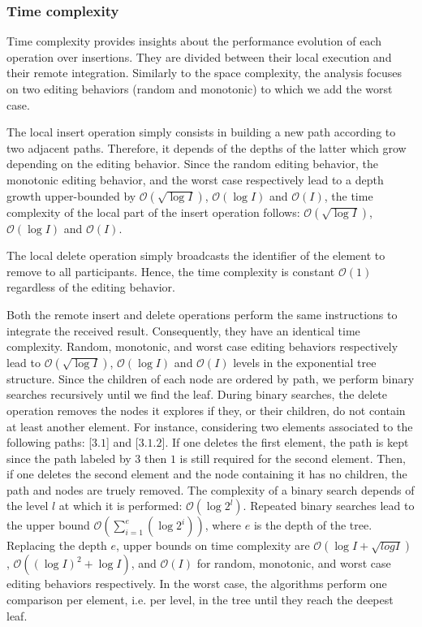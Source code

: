 \subsubsection{Time complexity}
\label{subsubsec:time}

Time complexity provides insights about the performance evolution of each
operation over insertions. They are divided between their local execution and
their remote integration.  Similarly to the space complexity, the analysis
focuses on two editing behaviors (random and monotonic) to which we add the
worst case.

The local insert operation simply consists in building a new path according to
two adjacent paths. Therefore, it depends of the depths of the latter which grow
depending on the editing behavior. Since the random editing behavior, the
monotonic editing behavior, and the worst case respectively lead to a depth
growth upper-bounded by $\mathcal{O}(\sqrt{\log I})$, $\mathcal{O}(\log I)$ and
$\mathcal{O}(I)$, the time complexity of the local part of the insert operation
follows: $\mathcal{O}(\sqrt{\log I})$, $\mathcal{O}(\log I)$ and
$\mathcal{O}(I)$.

The local delete operation simply broadcasts the identifier of the element to
remove to all participants. Hence, the time complexity is constant
$\mathcal{O}(1)$ regardless of the editing behavior.

Both the remote insert and delete operations perform the same instructions to
integrate the received result. Consequently, they have an identical time
complexity. Random, monotonic, and worst case editing behaviors respectively
lead to $\mathcal{O}(\sqrt{\log I})$, $\mathcal{O}(\log I)$ and $\mathcal{O}(I)$
levels in the exponential tree structure. Since the children of each node are
ordered by path, we perform binary searches recursively until we find the
leaf. During binary searches, the delete operation removes the nodes it explores
if they, or their children, do not contain at least another element. For
instance, considering two elements associated to the following paths: [$3.1$]
and [$3.1.2$]. If one deletes the first element, the path is kept since the path
labeled by $3$ then $1$ is still required for the second element. Then, if one
deletes the second element and the node containing it has no children, the path
and nodes are truely removed. The complexity of a binary search depends of the
level $l$ at which it is performed: $\mathcal{O}(\log 2^l)$. Repeated binary
searches lead to the upper bound
$\mathcal{O}(\textstyle\sum\nolimits_{i=1}^{e}(\log 2^i))$, where $e$ is the
depth of the tree. Replacing the depth $e$, upper bounds on time complexity are
$\mathcal{O}(\log I + \sqrt{log I})$, $\mathcal{O}((\log I)^2+\log I)$, and
$\mathcal{O}(I)$ for random, monotonic, and worst case editing behaviors
respectively. In the worst case, the algorithms perform one comparison per
element, i.e. per level, in the tree until they reach the deepest leaf.


